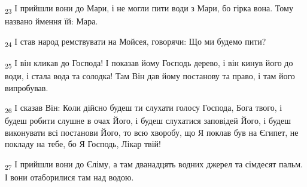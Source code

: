 \begin{tcolorbox}
\textsubscript{23} І прийшли вони до Мари, і не могли пити води з Мари, бо гірка вона. Тому названо ймення їй: Мара.
\end{tcolorbox}
\begin{tcolorbox}
\textsubscript{24} І став народ ремствувати на Мойсея, говорячи: Що ми будемо пити?
\end{tcolorbox}
\begin{tcolorbox}
\textsubscript{25} І він кликав до Господа! І показав йому Господь дерево, і він кинув його до води, і стала вода та солодка! Там Він дав йому постанову та право, і там його випробував.
\end{tcolorbox}
\begin{tcolorbox}
\textsubscript{26} І сказав Він: Коли дійсно будеш ти слухати голосу Господа, Бога твого, і будеш робити слушне в очах Його, і будеш слухатися заповідей Його, і будеш виконувати всі постанови Його, то всю хворобу, що Я поклав був на Єгипет, не покладу на тебе, бо Я Господь, Лікар твій!
\end{tcolorbox}
\begin{tcolorbox}
\textsubscript{27} І прийшли вони до Єліму, а там дванадцять водних джерел та сімдесят пальм. І вони отаборилися там над водою.
\end{tcolorbox}
